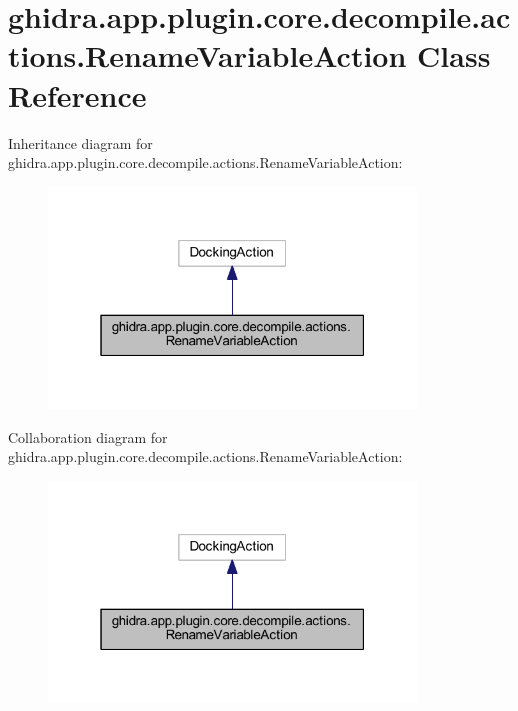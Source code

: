 \hypertarget{classghidra_1_1app_1_1plugin_1_1core_1_1decompile_1_1actions_1_1_rename_variable_action}{}\section{ghidra.\+app.\+plugin.\+core.\+decompile.\+actions.\+Rename\+Variable\+Action Class Reference}
\label{classghidra_1_1app_1_1plugin_1_1core_1_1decompile_1_1actions_1_1_rename_variable_action}


Inheritance diagram for ghidra.\+app.\+plugin.\+core.\+decompile.\+actions.\+Rename\+Variable\+Action\+:
\nopagebreak
\begin{figure}[H]
\begin{center}
\leavevmode
\includegraphics[width=277pt]{classghidra_1_1app_1_1plugin_1_1core_1_1decompile_1_1actions_1_1_rename_variable_action__inherit__graph}
\end{center}
\end{figure}


Collaboration diagram for ghidra.\+app.\+plugin.\+core.\+decompile.\+actions.\+Rename\+Variable\+Action\+:
\nopagebreak
\begin{figure}[H]
\begin{center}
\leavevmode
\includegraphics[width=277pt]{classghidra_1_1app_1_1plugin_1_1core_1_1decompile_1_1actions_1_1_rename_variable_action__coll__graph}
\end{center}
\end{figure}
